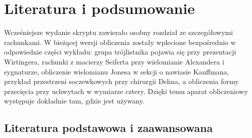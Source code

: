 \chapter{Literatura i podsumowanie}
\label{ch:kt-literatura-podsumowanie}

Wcześniejsze wydanie skryptu zawierało osobny rozdział ze szczegółowymi rachunkami. W bieżącej wersji obliczenia zostały wplecione bezpośrednio w odpowiednie części wykładu: grupa trójlistnika pojawia się przy prezentacji Wirtingera, rachunki z macierzy Seiferta przy wielomianie Alexandera i sygnaturze, obliczenie wielomianu Jonesa w sekcji o nawiasie Kauffmana, przykład przestrzeni soczewkowych przy chirurgii Dehna, a obliczenia formy przecięcia przy uchwytach w wymiarze cztery. Dzięki temu aparat obliczeniowy występuje dokładnie tam, gdzie jest używany.

\section{Literatura podstawowa i zaawansowana}
\label{sec:kt-literatura}

